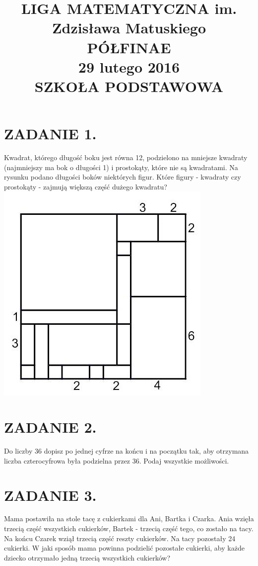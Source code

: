 \documentclass[10pt]{article}
\title{LIGA MATEMATYCZNA im. Zdzisława Matuskiego \\
 PÓŁFINAE \\
 29 lutego 2016 \\
 SZKOŁA PODSTAWOWA }
\author{}
\date{}
\begin{document}
\maketitle
\section*{ZADANIE 1.}
Kwadrat, którego długość boku jest równa 12, podzielono na mniejsze kwadraty (najmniejszy ma bok o długości 1) i prostokąty, które nie są kwadratami. Na rysunku podano długości boków niektórych figur. Które figury - kwadraty czy prostokąty - zajmują większą część dużego kwadratu?\\
\includegraphics[max width=\textwidth, center]{2024_11_21_98eb331bc97ef7c88443g-1}

\section*{ZADANIE 2.}
Do liczby 36 dopisz po jednej cyfrze na końcu i na początku tak, aby otrzymana liczba czterocyfrowa była podzielna przez 36. Podaj wszystkie możliwości.

\section*{ZADANIE 3.}
Mama postawiła na stole tacę z cukierkami dla Ani, Bartka i Czarka. Ania wzięła trzecią część wszystkich cukierków, Bartek - trzecią część tego, co zostało na tacy. Na końcu Czarek wziął trzecią część reszty cukierków. Na tacy pozostały 24 cukierki. W jaki sposób mama powinna podzielić pozostałe cukierki, aby każde dziecko otrzymało jedną trzecią wszystkich cukierków?
\end{document}
